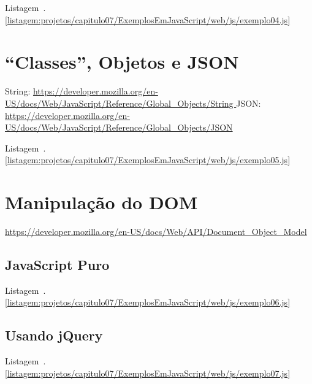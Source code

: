 Listagem~\thechapter.\ref{listagem:projetos/capitulo07/ExemplosEmJavaScript/web/js/exemplo04.js}




\section{``Classes'', Objetos e JSON}

String: \url{https://developer.mozilla.org/en-US/docs/Web/JavaScript/Reference/Global_Objects/String }
JSON: \url{https://developer.mozilla.org/en-US/docs/Web/JavaScript/Reference/Global_Objects/JSON}

Listagem~\thechapter.\ref{listagem:projetos/capitulo07/ExemplosEmJavaScript/web/js/exemplo05.js}




\section{Manipulação do DOM}

\url{https://developer.mozilla.org/en-US/docs/Web/API/Document_Object_Model}

\subsection{JavaScript Puro}

Listagem~\thechapter.\ref{listagem:projetos/capitulo07/ExemplosEmJavaScript/web/js/exemplo06.js}




\subsection{Usando jQuery}

Listagem~\thechapter.\ref{listagem:projetos/capitulo07/ExemplosEmJavaScript/web/js/exemplo07.js}

